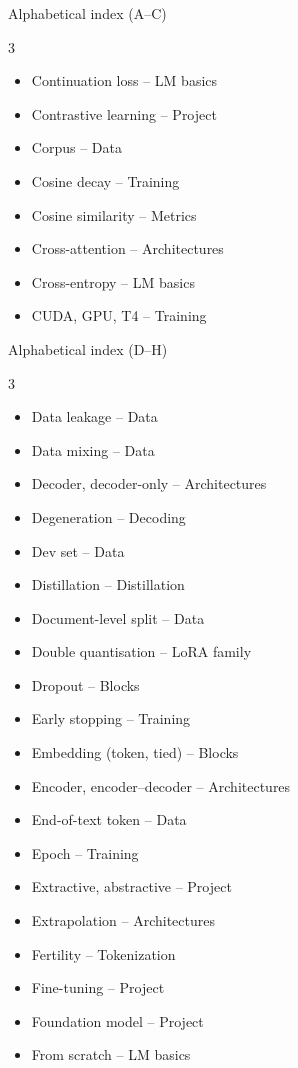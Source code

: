 \documentclass[aspectratio=169,11pt]{beamer}
\begin{document}
\begin{frame}{Alphabetical index (A--C)}
\begin{multicols}{3}
\begin{itemize}
    \item Continuation loss -- LM basics
    \item Contrastive learning -- Project
    \item Corpus -- Data
    \item Cosine decay -- Training
    \item Cosine similarity -- Metrics
    \item Cross-attention -- Architectures
    \item Cross-entropy -- LM basics
    \item CUDA, GPU, T4 -- Training
  \end{itemize}
  \end{multicols}
\end{frame}

\begin{frame}{Alphabetical index (D--H)}
  \footnotesize
  \begin{multicols}{3}
  \begin{itemize}\setlength{\itemsep}{0pt}
    \item Data leakage -- Data
    \item Data mixing -- Data
    \item Decoder, decoder-only -- Architectures
    \item Degeneration -- Decoding
    \item Dev set -- Data
    \item Distillation -- Distillation
    \item Document-level split -- Data
    \item Double quantisation -- LoRA family
    \item Dropout -- Blocks
    \item Early stopping -- Training
    \item Embedding (token, tied) -- Blocks
    \item Encoder, encoder--decoder -- Architectures
    \item End-of-text token -- Data
    \item Epoch -- Training
    \item Extractive, abstractive -- Project
    \item Extrapolation -- Architectures
    \item Fertility -- Tokenization
    \item Fine-tuning -- Project
    \item Foundation model -- Project
    \item From scratch -- LM basics

\end{itemize}
\end{multicols}
\end{frame}
\end{document}
